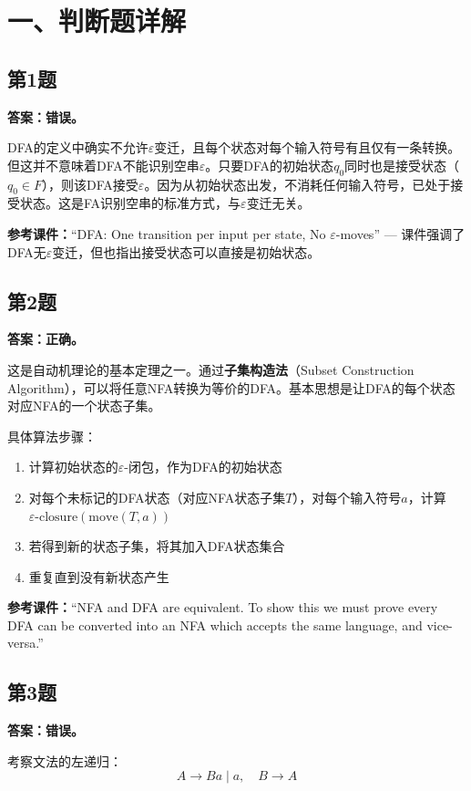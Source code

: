 \documentclass[12pt,a4paper,fontset=fandol]{ctexart}
\begin{document}
\section{一、判断题详解}

\subsection*{第1题}
\textbf{答案：错误。}

DFA的定义中确实不允许$\varepsilon$变迁，且每个状态对每个输入符号有且仅有一条转换。但这并不意味着DFA不能识别空串$\varepsilon$。只要DFA的初始状态$q_0$同时也是接受状态（$q_0 \in F$），则该DFA接受$\varepsilon$。因为从初始状态出发，不消耗任何输入符号，已处于接受状态。这是FA识别空串的标准方式，与$\varepsilon$变迁无关。

\medskip
\textbf{参考课件：}``DFA: One transition per input per state, No $\varepsilon$-moves'' — 课件强调了DFA无$\varepsilon$变迁，但也指出接受状态可以直接是初始状态。

\subsection*{第2题}
\textbf{答案：正确。}

这是自动机理论的基本定理之一。通过\textbf{子集构造法}（Subset Construction Algorithm），可以将任意NFA转换为等价的DFA。基本思想是让DFA的每个状态对应NFA的一个状态子集。

具体算法步骤：
\begin{enumerate}[label=(\arabic*)]
    \item 计算初始状态的$\varepsilon$-闭包，作为DFA的初始状态
    \item 对每个未标记的DFA状态（对应NFA状态子集$T$），对每个输入符号$a$，计算$\varepsilon\text{-closure}(\text{move}(T, a))$
    \item 若得到新的状态子集，将其加入DFA状态集合
    \item 重复直到没有新状态产生
\end{enumerate}

\textbf{参考课件：}``NFA and DFA are equivalent. To show this we must prove every DFA can be converted into an NFA which accepts the same language, and vice-versa.''

\subsection*{第3题}
\textbf{答案：错误。}

考察文法的左递归：
\[
A \to Ba \mid a, \quad B \to A
\]
\end{document}
